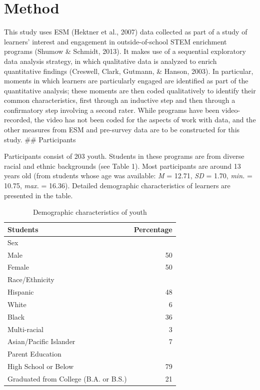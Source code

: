 \documentclass[]{book}
\theoremstyle{definition}
\theoremstyle{definition}
\theoremstyle{definition}
\theoremstyle{remark}
\begin{document}
\chapter{Method}\label{method}

This study uses ESM (Hektner et al., 2007) data collected as part of a
study of learners' interest and engagement in outside-of-school STEM
enrichment programs (Shumow \& Schmidt, 2013). It makes use of a
sequential exploratory data analysis strategy, in which qualitative data
is analyzed to enrich quantitative findings (Creswell, Clark, Gutmann,
\& Hanson, 2003). In particular, moments in which learners are
particularly engaged are identified as part of the quantitative
analysis; these moments are then coded qualitatively to identify their
common characteristics, first through an inductive step and then through
a confirmatory step involving a second rater. While programs have been
video-recorded, the video has not been coded for the aspects of work
with data, and the other measures from ESM and pre-survey data are to be
constructed for this study. \#\# Participants

Participants consist of 203 youth. Students in these programs are from
diverse racial and ethnic backgrounds (see Table 1). Most participants
are around 13 years old (from students whose age was available: \emph{M}
= 12.71, \emph{SD} = 1.70, \emph{min.} = 10.75, \emph{max.} = 16.36).
Detailed demographic characteristics of learners are presented in the
table.

\begin{table}

\caption{\label{tab:unnamed-chunk-4}Demographic characteristics of youth}
\centering
\begin{tabular}[t]{lr}
\toprule
Students & Percentage\\
\midrule
Sex & \\
Male & 50\\
Female & 50\\
Race/Ethnicity & \\
Hispanic & 48\\
\addlinespace
White & 6\\
Black & 36\\
Multi-racial & 3\\
Asian/Pacific Islander & 7\\
Parent Education & \\
\addlinespace
High School or Below & 79\\
Graduated from College (B.A. or B.S.) & 21\\
\bottomrule
\end{tabular}
\end{table}
\end{document}
